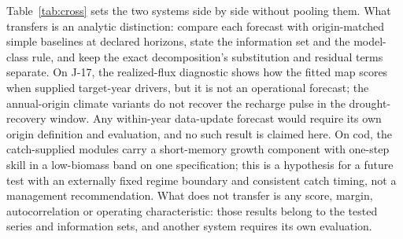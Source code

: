\documentclass[preprint,11pt,authoryear]{elsarticle}
\theoremstyle{definition}
\theoremstyle{remark}
\begin{document}
Table~\ref{tab:cross} sets the two systems side by side without pooling them. What transfers is an analytic distinction: compare each forecast with origin-matched simple baselines at declared horizons, state the information set and the model-class rule, and keep the exact decomposition's substitution and residual terms separate. On J-17, the realized-flux diagnostic shows how the fitted map scores when supplied target-year drivers, but it is not an operational forecast; the annual-origin climate variants do not recover the recharge pulse in the drought-recovery window. Any within-year data-update forecast would require its own origin definition and evaluation, and no such result is claimed here. On cod, the catch-supplied modules carry a short-memory growth component with one-step skill in a low-biomass band on one specification; this is a hypothesis for a future test with an externally fixed regime boundary and consistent catch timing, not a management recommendation. What does not transfer is any score, margin, autocorrelation or operating characteristic: those results belong to the tested series and information sets, and another system requires its own evaluation.
\end{document}
